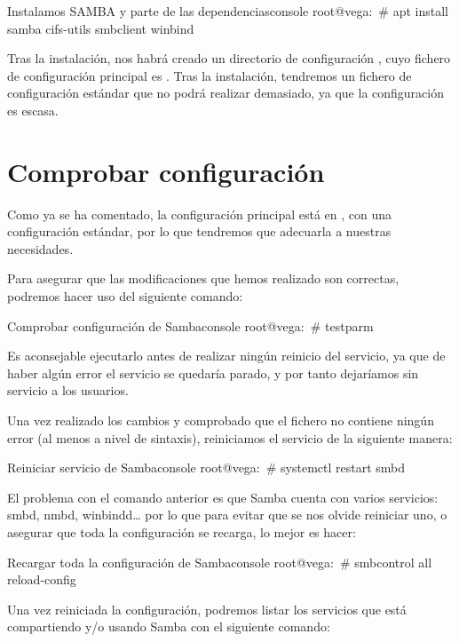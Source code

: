 \begin{mycode}{Instalamos SAMBA y parte de las dependencias}{console}{}
root@vega:~# apt install samba cifs-utils smbclient winbind
\end{mycode}

Tras la instalación, nos habrá creado un directorio de configuración   , cuyo fichero de configuración principal es  . Tras la instalación, tendremos un fichero de configuración estándar que no podrá realizar demasiado, ya que la configuración es escasa.

\section{Comprobar configuración}
Como ya se ha comentado, la configuración principal está en    , con una configuración estándar, por lo que tendremos que adecuarla a nuestras necesidades.

Para asegurar que las modificaciones que hemos realizado son correctas, podremos hacer uso del siguiente comando:

\begin{mycode}{Comprobar configuración de Samba}{console}{}
root@vega:~# testparm
\end{mycode}

Es aconsejable ejecutarlo antes de realizar ningún reinicio del servicio, ya que de haber algún error el servicio se quedaría parado, y por tanto dejaríamos sin servicio a los usuarios.

Una vez realizado los cambios y comprobado que el fichero no contiene ningún error (al menos a nivel de sintaxis), reiniciamos el servicio de la siguiente manera:

\begin{mycode}{Reiniciar servicio de Samba}{console}{}
root@vega:~# systemctl restart smbd
\end{mycode}

El problema con el comando anterior es que Samba cuenta con varios servicios: smbd, nmbd, winbindd… por lo que para evitar que se nos olvide reiniciar uno, o asegurar que toda la configuración se recarga, lo mejor es hacer:

\begin{mycode}{Recargar toda la configuración de Samba}{console}{}
root@vega:~# smbcontrol all reload-config
\end{mycode}

Una vez reiniciada la configuración, podremos listar los servicios que está compartiendo y/o usando Samba con el siguiente comando:


